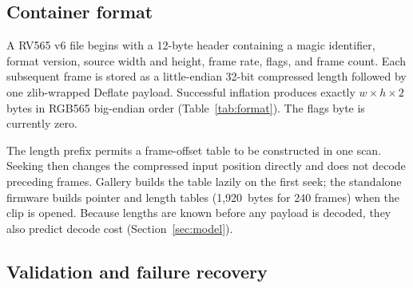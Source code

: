 \documentclass[11pt,twocolumn]{article}
\newcommand{\system}{RV565}
\begin{document}
\subsection{Container format}
\label{sec:container}

A \system{} v6 file begins with a 12-byte header containing a magic
identifier, format version, source width and height, frame rate, flags, and
frame count.  Each subsequent frame is stored as a little-endian 32-bit
compressed length followed by one zlib-wrapped Deflate payload.  Successful
inflation produces exactly $w\times h\times2$ bytes in RGB565 big-endian
order (Table~\ref{tab:format}).  The flags byte is currently zero.

\begin{table}[t]
\centering
\caption{\system{} v6 file layout. Multi-byte integers are little-endian;
decoded pixels are RGB565 big-endian.}
\label{tab:format}
\end{table}

The length prefix permits a frame-offset table to be constructed in one scan.
Seeking then changes the compressed input position directly and does not
decode preceding frames.  Gallery builds the table lazily on the first seek;
the standalone firmware builds pointer and length tables (1,920~bytes for 240
frames) when the clip is opened.  Because lengths are known before any
payload is decoded, they also predict decode cost
(Section~\ref{sec:model}).

\subsection{Validation and failure recovery}
\label{sec:validation}
\end{document}
